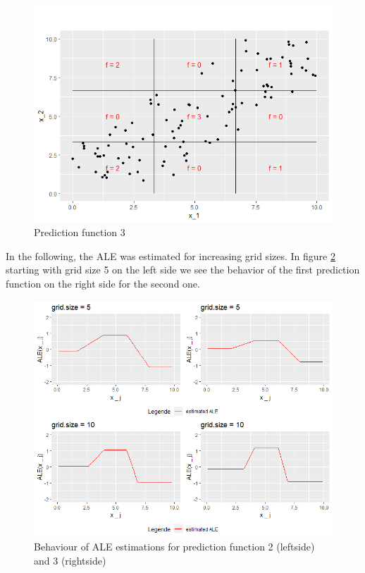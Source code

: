 \documentclass[
]{krantz}
\begin{document}
\begin{figure}
\includegraphics[width=1\linewidth]{images/ALE_2_pwc_example5_predf_2_} \caption{Prediction function 3}\label{fig:pwcexample5predf2}
\end{figure}



In the following, the ALE was estimated for increasing grid sizes. In figure \ref{fig:pwcexample5gs510} starting with grid size 5 on the left side we see the behavior of the first prediction function on the right side for the second one.

\begin{figure}
\includegraphics[width=1\linewidth]{images/ALE_2_pwc_example5_gs5_10_} \caption{Behaviour of ALE estimations for prediction function 2 (leftside) and 3 (rightside)}\label{fig:pwcexample5gs510}
\end{figure}
\end{document}
